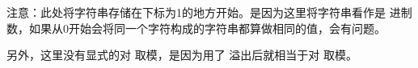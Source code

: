 \begin{information}
    注意：此处将字符串存储在下标为1的地方开始。是因为这里将字符串看作是  进制数，如果从0开始会将同一个字符构成的字符串都算做相同的值，会有问题。

    另外，这里没有显式的对  取模，是因为用了  溢出后就相当于对  取模。
\end{information}

